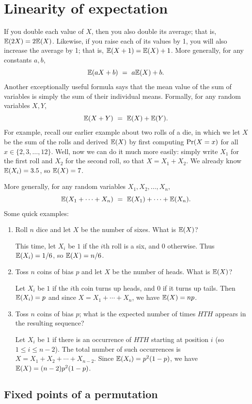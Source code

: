 \section{Linearity of expectation}

If you double each value of $X$, then you also double its average; that is, 
$\mathbb{E}(2X) = 2 \mathbb{E}(X)$. Likewise, if you raise each of its values by 1, you will
also increase the average by 1; that is, $\mathbb{E}(X+1) = \mathbb{E}(X) + 1$. More generally,
for any constants $a,b$,
$$ \mathbb{E}(aX + b) \ = \ a\mathbb{E}(X) + b.$$
Another exceptionally useful formula says that the mean value of the sum of
variables is simply the sum of their individual means. Formally, for 
any random variables $X, Y$,
$$ \mathbb{E}(X+Y) \ = \ \mathbb{E}(X) + \mathbb{E}(Y).$$
For example, recall our earlier example about two
rolls of a die, in which we let $X$ be the sum of the rolls and derived $\mathbb{E}(X)$
by first computing $\mbox{\rm Pr}(X = x)$ for all $x \in \{2,3,\ldots,12\}$. Well, now
we can do it much more easily: simply write $X_1$ for the first roll and $X_2$
for the second roll, so that $X = X_1 + X_2$. We already know $\mathbb{E}(X_i) = 3.5$,
so $\mathbb{E}(X) = 7$.

More generally, for any random variables $X_1, X_2, \ldots, X_n$,
$$ \mathbb{E}(X_1 + \cdots + X_n) \ = \ \mathbb{E}(X_1) + \cdots + \mathbb{E}(X_n) .$$
Some quick examples:
\begin{enumerate}
\item Roll $n$ dice and let $X$ be the number of sixes. What is $\mathbb{E}(X)$?

This time, let $X_i$ be $1$ if the $i$th roll is a six, and $0$ otherwise. Thus 
$\mathbb{E}(X_i) = 1/6$, so $\mathbb{E}(X) = n/6$.

\item Toss $n$ coins of bias $p$ and let $X$ be the number of heads. What is $\mathbb{E}(X)$?

Let $X_i$ be $1$ if the $i$th coin turns up heads, and $0$ if it turns up tails. Then
$\mathbb{E}(X_i) = p$ and since $X = X_1 + \cdots + X_n$, we have $\mathbb{E}(X) = np$.

\item Toss $n$ coins of bias $p$; what is the expected number of times $HTH$ appears 
in the resulting sequence?

Let $X_i$ be $1$ if there is an occurrence of $HTH$ starting at position $i$ (so
$1 \leq i \leq n-2$). The total number of such occurrences is
$X = X_1 + X_2 + \cdots + X_{n-2}$. Since $\mathbb{E}(X_i) = p^2(1-p)$, we have 
$\mathbb{E}(X) = (n-2) p^2(1-p)$.
\end{enumerate}

\subsection{Fixed points of a permutation}

